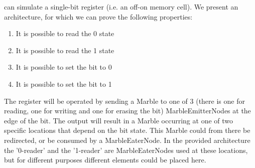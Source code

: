 \nenwin can simulate a single-bit register (i.e. an off-on memory cell).
We present an architecture, for which we can prove the following properties:
\begin{enumerate}
    \item It is possible to read the 0 state
    \item It is possible to read the 1 state
    \item It is possible to set the bit to 0
    \item It is possible to set the bit to 1
\end{enumerate}
The register will be operated by sending a Marble to one of 3 (there is one for reading, one for writing and one for erasing the bit) MarbleEmitterNodes at the edge of the bit. The output will result in a Marble occurring at one of two specific locations that depend on the bit state. This Marble could from there be redirected, or be consumed by a MarbleEaterNode. In the provided architecture the '0-reader' and the '1-reader' are MarbleEaterNodes used at these locations, but for different purposes different elements could be placed here.

